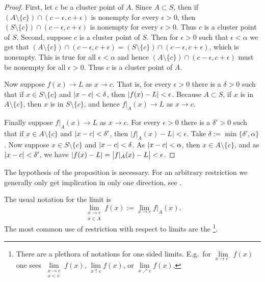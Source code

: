 \begin{proof}
First, let $c$ be a cluster point of $A$.
Since $A \subset S$, then if $( A \setminus \{ c\} ) \cap
(c-\epsilon,c+\epsilon)$ is nonempty for every $\epsilon > 0$,
then $( S \setminus \{ c\} ) \cap
(c-\epsilon,c+\epsilon)$ is nonempty for every $\epsilon > 0$.
Thus $c$ is a cluster point of $S$.
Second, suppose $c$ is a cluster
point of $S$.  Then for $\epsilon > 0$ such that $\epsilon < \alpha$
we get that $( A \setminus \{ c\} ) \cap (c-\epsilon,c+\epsilon) =
( S \setminus \{ c\} ) \cap (c-\epsilon,c+\epsilon)$, which is nonempty.  This is true for all
$\epsilon < \alpha$ and hence 
$( A \setminus \{ c\} ) \cap (c-\epsilon,c+\epsilon)$ must be nonempty for all
$\epsilon > 0$.  Thus $c$ is a cluster point of $A$.

Now suppose $f(x) \to L$ as $x \to c$.  That is, for every $\epsilon > 0$
there is a $\delta > 0$ such that if $x \in S \setminus \{ c \}$
and $\left\lvert {x-c} \right\rvert < \delta$, then $\left\lvert {f(x)-L} \right\rvert < \epsilon$.  Because $A \subset S$,
if $x$ is in $A \setminus \{ c \}$, then $x$ is in $S \setminus \{ c
\}$, and hence $f|_A(x) \to L$ as $x \to c$.

Finally suppose $f|_A(x) \to L$ as $x \to c$.
For every $\epsilon > 0$
there is a $\delta' > 0$ such that if $x \in A \setminus \{ c \}$
and $\left\lvert {x-c} \right\rvert < \delta'$, then $\bigl\lvert f|_A(x)-L \bigr\rvert < \epsilon$.
Take $\delta := \min \{ \delta', \alpha \}$.
Now suppose $x \in S \setminus \{ c \}$ and
$\left\lvert {x-c} \right\rvert < \delta$.  As $\left\lvert {x-c} \right\rvert < \alpha$, then $x \in A \setminus \{ c \}$,
and as $\left\lvert {x-c} \right\rvert < \delta'$, 
we have $\left\lvert {f(x)-L} \right\rvert = \bigl\lvert f|_A(x)-L
\bigr\rvert < \epsilon$.
\end{proof}

The hypothesis of the proposition is necessary.  For an arbitrary
restriction we generally only get implication in only one direction,
see .  

The usual notation for the limit is
\begin{equation*}
\lim_{\substack{x \to c\\x \in A}} f(x) := \lim_{x \to c} f|_A(x) .
\end{equation*}
The most common use of restriction with respect to limits
are the \emph{}%
\footnote{%
There are a plethora of notations for one sided limits.  E.g.\ for
$\lim\limits_{x \to c^-} f(x)$ one sees
$\lim\limits_{\substack{x \to c\\x < c}} f(x)$,
$\lim\limits_{x \uparrow c} f(x)$, or
$\lim\limits_{x \nearrow c} f(x)$.}.

